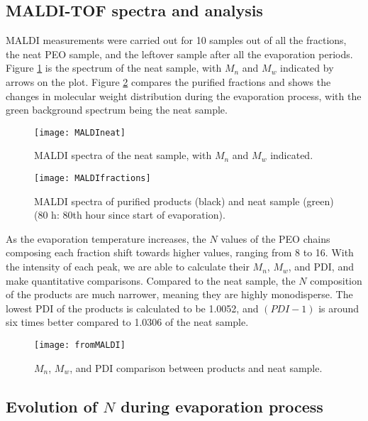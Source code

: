 \subsection{MALDI-TOF spectra and analysis}

MALDI measurements were carried out for 10 samples out of all the fractions, the neat PEO sample, and the leftover sample after all the evaporation periods. Figure \ref{fig:MALDIneat} is the spectrum of the neat sample, with $M_{n}$ and $M_{w}$ indicated by arrows on the plot. Figure \ref{fig:MALDIfractions} compares the purified fractions and shows the changes in molecular weight distribution during the evaporation process, with the green background spectrum being the neat sample.

\begin{figure}[H]
	\center
	\texttt{[image: MALDIneat]}
	\caption{MALDI spectra of the neat sample, with $M_{n}$ and $M_{w}$ indicated.}
	\label{fig:MALDIneat}
\end{figure}

\begin{figure}[H]
\center
\texttt{[image: MALDIfractions]}
\caption{MALDI spectra of purified products (black) and neat sample (green) (80 h: 80th hour since start of evaporation).}
\label{fig:MALDIfractions}
\end{figure}

As the evaporation temperature increases, the $N$ values of the PEO chains composing each fraction shift towards higher values, ranging from 8 to 16. With the intensity of each peak, we are able to calculate their $M_{n}$, $M_{w}$, and PDI, and make quantitative comparisons. Compared to the neat sample, the $N$ composition of the products are much narrower, meaning they are highly monodisperse. The lowest PDI of the products is calculated to be 1.0052, and $(PDI - 1)$ is around six times better compared to 1.0306 of the neat sample.

\begin{figure}[H]
\center
\texttt{[image: fromMALDI]}
\caption{$M_{n}$, $M_{w}$, and PDI comparison between products and neat sample.}
\label{fig:fromMALDI}
\end{figure}

\subsection{Evolution of $N$ during evaporation process}

